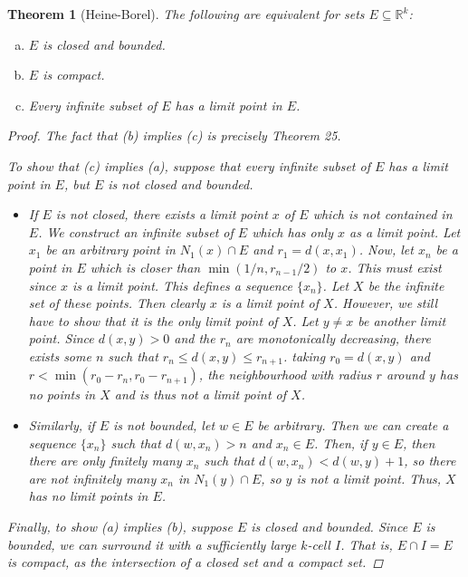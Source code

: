 \documentclass{scrbook}
\newcommand{\R}{\mathbb{R}}
\newtheorem{theorem}{Theorem}
\begin{document}
\begin{theorem}[Heine-Borel]
The following are equivalent for sets $E \subseteq \R^k$:
\begin{enumerate}[(a)]
\item $E$ is closed and bounded.
\item $E$ is compact.
\item Every infinite subset of $E$ has a limit point in $E$.
\end{enumerate}

\begin{proof}
The fact that (b) implies (c) is precisely Theorem 25. 

To show that (c) implies (a), suppose that every infinite subset of $E$ has a limit point in $E$, but $E$ is not closed and bounded. 

\begin{itemize}
\item 
If $E$ is not closed, there exists a limit point $x$ of $E$ which is not contained in $E$. We construct an infinite subset of $E$ which has only $x$ as a limit point. Let $x_1$ be an arbitrary point in $N_1(x) \cap E$ and $r_1 = d(x, x_1)$. Now, let $x_n$ be a point in $E$ which is closer than $\min(1/n, r_{n-1}/2)$ to $x$. This must exist since $x$ is a limit point. This defines a sequence $\{x_n\}$. Let $X$ be the infinite set of these points. Then clearly $x$ is a limit point of $X$. However, we still have to show that it is the only limit point of $X$. Let $y \ne x$ be another limit point. Since $d(x, y) > 0$ and the $r_n$ are monotonically decreasing, there exists some $n$ such that $r_n \le d(x, y) \le r_{n+1}$. taking $r_0 = d(x, y)$ and $r < \min(r_0 - r_n, r_0 - r_{n+1})$, the neighbourhood with radius $r$ around $y$ has no points in $X$ and is thus not a limit point of $X$. 

\item
Similarly, if $E$ is not bounded, let $w \in E$ be arbitrary. Then we can create a sequence $\{x_n\}$ such that $d(w, x_n) > n$ and $x_n \in E$. Then, if $y \in E$, then there are only finitely many $x_n$ such that $d(w, x_n) < d(w, y) + 1$, so there are not infinitely many $x_n$ in $N_1(y) \cap E$, so $y$ is not a limit point. Thus, $X$ has no limit points in $E$.

\end{itemize}

Finally, to show (a) implies (b), suppose $E$ is closed and bounded. Since $E$ is bounded, we can surround it with a sufficiently large $k$-cell $I$. That is, $E \cap I = E$ is compact, as the intersection of a closed set and a compact set.
\end{proof}
\end{theorem}
\end{document}
